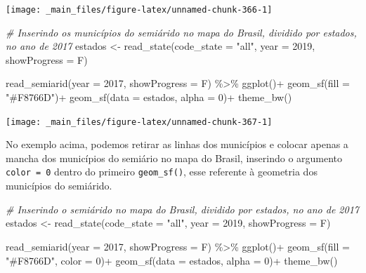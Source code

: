 \documentclass[
  brazilian,
]{book}
\newenvironment{Shaded}{\begin{snugshade}}{\end{snugshade}}
\newcommand{\AttributeTok}[1]{\textcolor[rgb]{0.77,0.63,0.00}{#1}}
\newcommand{\CommentTok}[1]{\textcolor[rgb]{0.56,0.35,0.01}{\textit{#1}}}
\newcommand{\DecValTok}[1]{\textcolor[rgb]{0.00,0.00,0.81}{#1}}
\newcommand{\FunctionTok}[1]{\textcolor[rgb]{0.00,0.00,0.00}{#1}}
\newcommand{\NormalTok}[1]{#1}
\newcommand{\OtherTok}[1]{\textcolor[rgb]{0.56,0.35,0.01}{#1}}
\newcommand{\SpecialCharTok}[1]{\textcolor[rgb]{0.00,0.00,0.00}{#1}}
\newcommand{\StringTok}[1]{\textcolor[rgb]{0.31,0.60,0.02}{#1}}
\begin{document}
\begin{center}\texttt{[image: \_main\_files/figure-latex/unnamed-chunk-366-1]} \end{center}

\begin{Shaded}
\begin{Highlighting}[]
\CommentTok{\# Inserindo os municípios do semiárido no mapa do Brasil, dividido por estados, no ano de 2017}
\NormalTok{estados }\OtherTok{\textless{}{-}} \FunctionTok{read\_state}\NormalTok{(}\AttributeTok{code\_state =} \StringTok{"all"}\NormalTok{,}
                      \AttributeTok{year =} \DecValTok{2019}\NormalTok{,}
                      \AttributeTok{showProgress =}\NormalTok{ F)}

\FunctionTok{read\_semiarid}\NormalTok{(}\AttributeTok{year =} \DecValTok{2017}\NormalTok{,}
              \AttributeTok{showProgress =}\NormalTok{ F) }\SpecialCharTok{\%\textgreater{}\%} 
  \FunctionTok{ggplot}\NormalTok{()}\SpecialCharTok{+}
  \FunctionTok{geom\_sf}\NormalTok{(}\AttributeTok{fill =} \StringTok{"\#F8766D"}\NormalTok{)}\SpecialCharTok{+}
  \FunctionTok{geom\_sf}\NormalTok{(}\AttributeTok{data =}\NormalTok{ estados, }\AttributeTok{alpha =} \DecValTok{0}\NormalTok{)}\SpecialCharTok{+}
  \FunctionTok{theme\_bw}\NormalTok{()}
\end{Highlighting}
\end{Shaded}

\begin{center}\texttt{[image: \_main\_files/figure-latex/unnamed-chunk-367-1]} \end{center}

No exemplo acima, podemos retirar as linhas dos municípios e colocar apenas a mancha dos municípios do semiário no mapa do Brasil, inserindo o argumento \texttt{color\ =\ 0} dentro do primeiro \texttt{geom\_sf()}, esse referente à geometria dos municípios do semiárido.

\begin{Shaded}
\begin{Highlighting}[]
\CommentTok{\# Inserindo o semiárido no mapa do Brasil, dividido por estados, no ano de 2017}
\NormalTok{estados }\OtherTok{\textless{}{-}} \FunctionTok{read\_state}\NormalTok{(}\AttributeTok{code\_state =} \StringTok{"all"}\NormalTok{,}
                      \AttributeTok{year =} \DecValTok{2019}\NormalTok{,}
                      \AttributeTok{showProgress =}\NormalTok{ F)}

\FunctionTok{read\_semiarid}\NormalTok{(}\AttributeTok{year =} \DecValTok{2017}\NormalTok{,}
              \AttributeTok{showProgress =}\NormalTok{ F) }\SpecialCharTok{\%\textgreater{}\%} 
  \FunctionTok{ggplot}\NormalTok{()}\SpecialCharTok{+}
  \FunctionTok{geom\_sf}\NormalTok{(}\AttributeTok{fill =} \StringTok{"\#F8766D"}\NormalTok{, }\AttributeTok{color =} \DecValTok{0}\NormalTok{)}\SpecialCharTok{+}
  \FunctionTok{geom\_sf}\NormalTok{(}\AttributeTok{data =}\NormalTok{ estados, }\AttributeTok{alpha =} \DecValTok{0}\NormalTok{)}\SpecialCharTok{+}
  \FunctionTok{theme\_bw}\NormalTok{()}
\end{Highlighting}
\end{Shaded}
\end{document}

